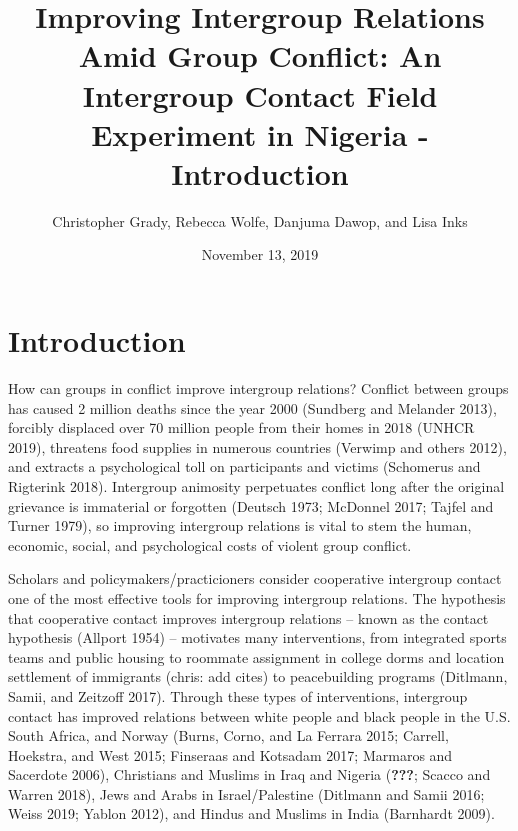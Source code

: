\documentclass[11pt]{article}
\title{Improving Intergroup Relations Amid Group Conflict: An Intergroup
Contact Field Experiment in Nigeria - Introduction}
\author{
Christopher Grady, Rebecca Wolfe, Danjuma Dawop, and Lisa Inks
}
\date{November 13, 2019}
\begin{document}
\VerbatimFootnotes

%
%
%
%
%
%
%
%
%
%

\maketitle

\hypertarget{introduction}{%
\section{Introduction}\label{introduction}}

How can groups in conflict improve intergroup relations? Conflict
between groups has caused 2 million deaths since the year 2000 (Sundberg
and Melander 2013), forcibly displaced over 70 million people from their
homes in 2018 (UNHCR 2019), threatens food supplies in numerous
countries (Verwimp and others 2012), and extracts a psychological toll
on participants and victims (Schomerus and Rigterink 2018). Intergroup
animosity perpetuates conflict long after the original grievance is
immaterial or forgotten (Deutsch 1973; McDonnel 2017; Tajfel and Turner
1979), so improving intergroup relations is vital to stem the human,
economic, social, and psychological costs of violent group conflict.

Scholars and policymakers/practicioners consider cooperative intergroup
contact one of the most effective tools for improving intergroup
relations. The hypothesis that cooperative contact improves intergroup
relations -- known as the contact hypothesis (Allport 1954) -- motivates
many interventions, from integrated sports teams and public housing to
roommate assignment in college dorms and location settlement of
immigrants (chris: add cites) to peacebuilding programs (Ditlmann,
Samii, and Zeitzoff 2017). Through these types of interventions,
intergroup contact has improved relations between white people and black
people in the U.S. South Africa, and Norway (Burns, Corno, and La
Ferrara 2015; Carrell, Hoekstra, and West 2015; Finseraas and Kotsadam
2017; Marmaros and Sacerdote 2006), Christians and Muslims in Iraq and
Nigeria ({\textbf{???}}; Scacco and Warren 2018), Jews and Arabs in
Israel/Palestine (Ditlmann and Samii 2016; Weiss 2019; Yablon 2012), and
Hindus and Muslims in India (Barnhardt 2009).
\end{document}
